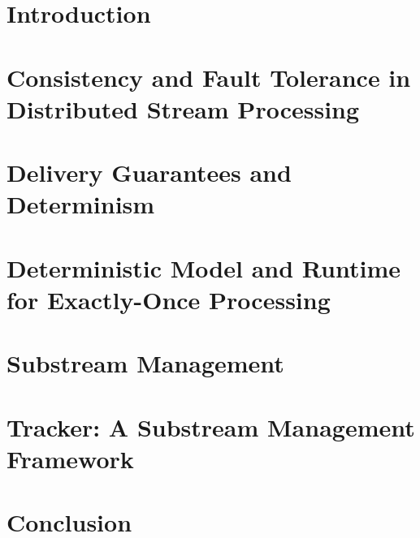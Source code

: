 \documentclass[a4paper, 12pt, oneside]{Thesis}  %
\theoremstyle{definition}
\begin{document}
\chapter{Introduction}

\chapter{Consistency and Fault Tolerance in Distributed Stream Processing}
\label{thesis-chapter-literature-review}


\chapter{Delivery Guarantees and Determinism}
\label{thesis-chapter-delivery-guarantees}


\chapter{Deterministic Model and Runtime for Exactly-Once Processing}
\label{thesis-chapther-optimistic}


\chapter{Substream Management}
\label{thesis-chapter-substreams-consistency}


\chapter{Tracker: A Substream Management Framework}
\label{thesis-chapter-tracker}


\chapter{Conclusion}
\label{thesis-chapter-conclusion}

\end{document}
